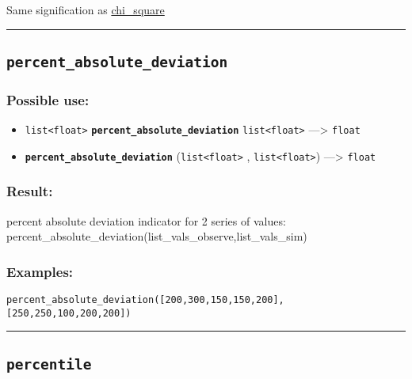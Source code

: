 \documentclass[]{book}
\providecommand{\tightlist}{%
  \setlength{\itemsep}{0pt}\setlength{\parskip}{0pt}}
\theoremstyle{definition}
\theoremstyle{definition}
\theoremstyle{definition}
\theoremstyle{remark}
\begin{document}
Same signification as \href{OperatorsBC\#chi_square}{chi\_square}

\begin{center}\rule{0.5\linewidth}{\linethickness}\end{center}

\subsection{\texorpdfstring{\texttt{percent\_absolute\_deviation}}{percent\_absolute\_deviation}}\label{percent_absolute_deviation}

\subsubsection{Possible use:}\label{possible-use-398}

\begin{itemize}
\tightlist
\item
  \texttt{list\textless{}float\textgreater{}}
  \textbf{\texttt{percent\_absolute\_deviation}}
  \texttt{list\textless{}float\textgreater{}} ---\textgreater{}
  \texttt{float}
\item
  \textbf{\texttt{percent\_absolute\_deviation}}
  (\texttt{list\textless{}float\textgreater{}} ,
  \texttt{list\textless{}float\textgreater{}}) ---\textgreater{}
  \texttt{float}
\end{itemize}

\subsubsection{Result:}\label{result-384}

percent absolute deviation indicator for 2 series of values:
percent\_absolute\_deviation(list\_vals\_observe,list\_vals\_sim)

\subsubsection{Examples:}\label{examples-274}

\begin{verbatim}
percent_absolute_deviation([200,300,150,150,200],[250,250,100,200,200]) 
\end{verbatim}

\begin{center}\rule{0.5\linewidth}{\linethickness}\end{center}

\subsection{\texorpdfstring{\texttt{percentile}}{percentile}}\label{percentile}
\end{document}
